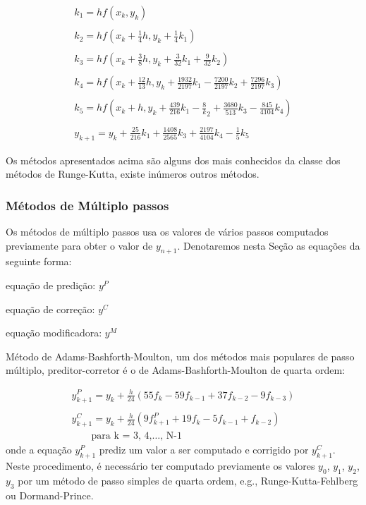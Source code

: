 \begin{equation*}
\begin{split}
k_{1} = hf(x_{k}, y_{k})\\
\\
k_{2} = hf(x_{k} + \frac{1}{4}h, y_{k} + \frac{1}{4}k_{1})\\
\\
k_{3} = hf(x_{k} + \frac{3}{8}h, y_{k} + \frac{3}{32}k_{1} + \frac{9}{32}k_{2})\\
\\
k_{4} = hf(x_{k} + \frac{12}{13}h, y_{k} + \frac{1932}{2197}k_{1} - \frac{7200}{2197}k_{2} + \frac{7296}{2197}k_{3})\\
\\
k_{5} = hf(x_{k} + h, y_{k} + \frac{439}{216}k_{1} - \frac{8}k_{2} + \frac{3680}{513}k_{3} - \frac{845}{4104}k_{4})\\
\\
y_{k+1} = y_{k} + \frac{25}{216}k_{1} + \frac{1408}{2565}k_{3} + \frac{2197}{4104}k_{4} - \frac{1}{5}k_{5}
\end{split}
\end{equation*}

Os métodos apresentados acima são alguns dos mais conhecidos da classe dos métodos
de Runge-Kutta, existe inúmeros outros métodos.

\subsubsection{Métodos de Múltiplo passos}
Os métodos de múltiplo passos usa os valores de vários passos computados 
previamente para obter o valor de $y_{n+1}$.
Denotaremos nesta Seção as equações da seguinte forma:

equação de predição: $y^{P}$

equação de correção: $y^{C}$

equação modificadora: $y^{M}$

Método de Adams-Bashforth-Moulton, um dos métodos mais populares de passo múltiplo, preditor-corretor é o de 
Adams-Bashforth-Moulton de quarta ordem:

\begin{equation*}
\begin{split}
y^{P}_{k+1} = y_{k} + \frac{h}{24}(55f_{k} - 59f_{k-1} + 37f_{k-2} - 9f_{k-3})\\
\\
y^{C}_{k+1} = y_{k} + \frac{h}{24}(9f^{P}_{k+1} + 19f_{k} - 5f_{k-1} + f_{k-2})\\
\qquad \text{para k = 3, 4,$\dotsc$, N-1}
\end{split}
\end{equation*}
onde a equação $y^{P}_{k+1}$ prediz um valor a ser computado e corrigido por $y^{C}_{k+1}$.
Neste procedimento, é necessário ter computado previamente os valores $y_{0}$, $y_{1}$, $y_{2}$, $y_{3}$ por um
método de passo simples de quarta ordem, e.g., Runge-Kutta-Fehlberg ou Dormand-Prince. 

